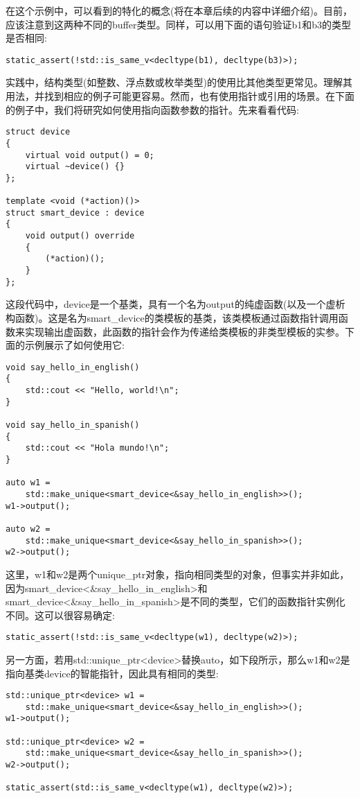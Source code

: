 在这个示例中，可以看到的特化的概念(将在本章后续的内容中详细介绍)。目前，应该注意到这两种不同的buffer类型。同样，可以用下面的语句验证b1和b3的类型是否相同:

\begin{lstlisting}[style=styleCXX]
static_assert(!std::is_same_v<decltype(b1), decltype(b3)>);
\end{lstlisting}

实践中，结构类型(如整数、浮点数或枚举类型)的使用比其他类型更常见。理解其用法，并找到相应的例子可能更容易。然而，也有使用指针或引用的场景。在下面的例子中，我们将研究如何使用指向函数参数的指针。先来看看代码:

\begin{lstlisting}[style=styleCXX]
struct device
{
	virtual void output() = 0;
	virtual ~device() {}
};

template <void (*action)()>
struct smart_device : device
{
	void output() override
	{
		(*action)();
	}
};
\end{lstlisting}

这段代码中，device是一个基类，具有一个名为output的纯虚函数(以及一个虚析构函数)。这是名为smart\_device的类模板的基类，该类模板通过函数指针调用函数来实现输出虚函数，此函数的指针会作为传递给类模板的非类型模板的实参。下面的示例展示了如何使用它:

\begin{lstlisting}[style=styleCXX]
void say_hello_in_english()
{
	std::cout << "Hello, world!\n";
}

void say_hello_in_spanish()
{
	std::cout << "Hola mundo!\n";
}

auto w1 =
	std::make_unique<smart_device<&say_hello_in_english>>();
w1->output();

auto w2 =
	std::make_unique<smart_device<&say_hello_in_spanish>>();
w2->output();
\end{lstlisting}

这里，w1和w2是两个unique\_ptr对象，指向相同类型的对象，但事实并非如此，因为smart\_device<\&say\_hello\_in\_english>和smart\_device<\&say\_hello\_in\_spanish>是不同的类型，它们的函数指针实例化不同。这可以很容易确定:

\begin{lstlisting}[style=styleCXX]
static_assert(!std::is_same_v<decltype(w1), decltype(w2)>);
\end{lstlisting}

另一方面，若用std::unique\_ptr<device>替换auto，如下段所示，那么w1和w2是指向基类device的智能指针，因此具有相同的类型:

\begin{lstlisting}[style=styleCXX]
std::unique_ptr<device> w1 =
	std::make_unique<smart_device<&say_hello_in_english>>();
w1->output();

std::unique_ptr<device> w2 =
	std::make_unique<smart_device<&say_hello_in_spanish>>();
w2->output();

static_assert(std::is_same_v<decltype(w1), decltype(w2)>);
\end{lstlisting}

